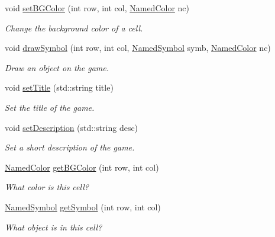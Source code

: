\begin{DoxyCompactItemize}
void \hyperlink{classbridges_1_1game_1_1_game_base_ab667bbca1c81e5fb3aa8d81d70fe8cd2}{set\+B\+G\+Color} (int row, int col, \hyperlink{namespacebridges_1_1game_afaa832a4322b25b6a4ebfba832f10f26}{Named\+Color} nc)
\begin{DoxyCompactList}\small\item\em Change the background color of a cell. \end{DoxyCompactList}\item 
void \hyperlink{classbridges_1_1game_1_1_game_base_a415fa8f70bef364dfa966f2a86048901}{draw\+Symbol} (int row, int col, \hyperlink{namespacebridges_1_1game_ab9a19c7ab6e2ebac2f95180e21733487}{Named\+Symbol} symb, \hyperlink{namespacebridges_1_1game_afaa832a4322b25b6a4ebfba832f10f26}{Named\+Color} nc)
\begin{DoxyCompactList}\small\item\em Draw an object on the game. \end{DoxyCompactList}\item 
void \hyperlink{classbridges_1_1game_1_1_game_base_a108c2e3050a4d3f3af9950434e97102a}{set\+Title} (std\+::string title)
\begin{DoxyCompactList}\small\item\em Set the title of the game. \end{DoxyCompactList}\item 
void \hyperlink{classbridges_1_1game_1_1_game_base_ab490d78e11e4117c3a4915c78afa0973}{set\+Description} (std\+::string desc)
\begin{DoxyCompactList}\small\item\em Set a short description of the game. \end{DoxyCompactList}\item 
\hyperlink{namespacebridges_1_1game_afaa832a4322b25b6a4ebfba832f10f26}{Named\+Color} \hyperlink{classbridges_1_1game_1_1_game_base_a924f911774a89d18ccb391bb28fd703c}{get\+B\+G\+Color} (int row, int col)
\begin{DoxyCompactList}\small\item\em What color is this cell? \end{DoxyCompactList}\item 
\hyperlink{namespacebridges_1_1game_ab9a19c7ab6e2ebac2f95180e21733487}{Named\+Symbol} \hyperlink{classbridges_1_1game_1_1_game_base_a0dfec715b0ed49c37b4b6689f2470b25}{get\+Symbol} (int row, int col)
\begin{DoxyCompactList}\small\item\em What object is in this cell? \end{DoxyCompactList}\item 

\end{DoxyCompactItemize}
